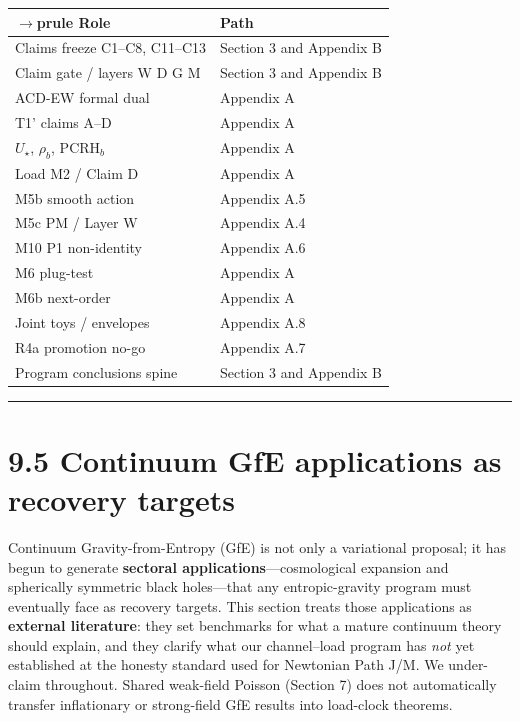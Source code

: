 \documentclass[
  11pt,
]{article}
\newcounter{none} %
\begin{document}
{\def\LTcaptype{none} %
\begin{longtable}[]{@{}ll@{}}
$\rightarrow$prule\noalign{}
Role & Path \\
\midrule\noalign{}
\endhead
\bottomrule\noalign{}
\endlastfoot
Claims freeze C1--C8, C11--C13 & Section 3 and Appendix B \\
Claim gate / layers W D G M & Section 3 and Appendix B \\
ACD-EW formal dual & Appendix A \\
T1' claims A--D & Appendix A \\
\(U_\star\), \(\rho_b\), PCRH\(_b\) & Appendix A \\
Load M2 / Claim D & Appendix A \\
M5b smooth action & Appendix A.5 \\
M5c PM / Layer W & Appendix A.4 \\
M10 P1 non-identity & Appendix A.6 \\
M6 plug-test & Appendix A \\
M6b next-order & Appendix A \\
Joint toys / envelopes & Appendix A.8 \\
R4a promotion no-go & Appendix A.7 \\
Program conclusions spine & Section 3 and Appendix B \\
\end{longtable}
}

\begin{center}\rule{0.5\linewidth}{0.5pt}\end{center}

\section{9.5 Continuum GfE applications as recovery targets}\label{continuum-gfe-applications-as-recovery-targets}

Continuum Gravity-from-Entropy (GfE) is not only a variational proposal; it has begun to generate \textbf{sectoral applications}---cosmological expansion and spherically symmetric black holes---that any entropic-gravity program must eventually face as recovery targets. This section treats those applications as \textbf{external literature}: they set benchmarks for what a mature continuum theory should explain, and they clarify what our channel--load program has \emph{not} yet established at the honesty standard used for Newtonian Path J/M. We under-claim throughout. Shared weak-field Poisson (Section 7) does not automatically transfer inflationary or strong-field GfE results into load-clock theorems.
\end{document}
